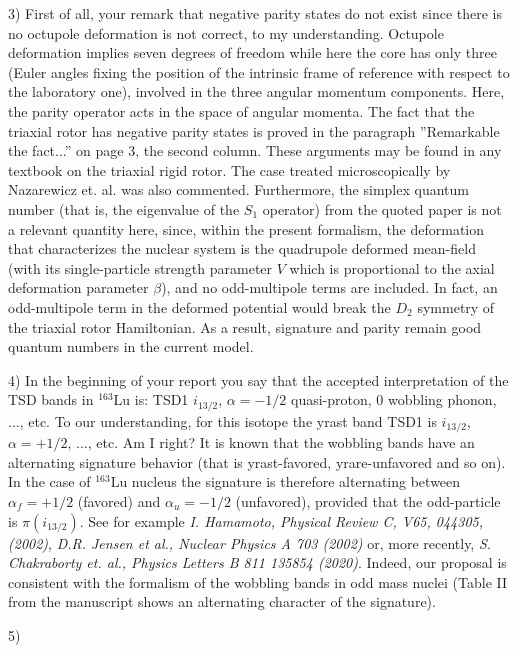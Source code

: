 \documentclass[11pt,a4paper]{article}
\begin{document}
3) First of all, your remark that negative parity states do not exist since there is no octupole deformation is not correct, to my understanding. Octupole deformation implies seven degrees of freedom while here the core has only three (Euler angles fixing the position of the intrinsic frame of reference with respect to the laboratory one), involved in the three angular momentum components. Here, the parity operator acts in the space of angular momenta. The fact that the triaxial rotor has negative parity states is proved in the paragraph ”Remarkable the fact...” on page 3, the second column. These arguments may be found in any textbook on the triaxial rigid rotor. The case treated microscopically by Nazarewicz et. al. was also commented. Furthermore, the simplex quantum number (that is, the eigenvalue of the $S_1$ operator) from the quoted paper is not a relevant quantity here, since, within the present formalism, the deformation that characterizes the nuclear system is the quadrupole deformed mean-field (with its single-particle strength parameter $V$ which is proportional to the axial deformation parameter $\beta$), and no odd-multipole terms are included. In fact, an odd-multipole term in the deformed potential would break the $D_2$ symmetry of the triaxial rotor Hamiltonian. As a result, signature and parity remain good quantum numbers in the current model.

4) In the beginning of your report you say that the accepted interpretation of the TSD bands in $^{163}$Lu is: TSD1 $i_{13/2}$, $\alpha = -1/2$ quasi-proton, 0 wobbling phonon, ..., etc. To our understanding, for this isotope the yrast band TSD1 is $i_{13/2}$,  $\alpha= +1/2$, ..., etc. Am I right? It is known that the wobbling bands have an alternating signature behavior (that is yrast-favored, yrare-unfavored and so on). In the case of $^{163}$Lu nucleus the signature is therefore alternating between $\alpha_f=+1/2$ (favored) and $\alpha_u=-1/2$ (unfavored), provided that the odd-particle is $\pi(i_{13/2})$. See for example \emph{I. Hamamoto, Physical Review C, V65, 044305, (2002)}, \emph{D.R. Jensen et al., Nuclear Physics A 703 (2002)} or, more recently, \emph{S. Chakraborty et. al., Physics Letters B 811 135854 (2020)}. Indeed, our proposal is consistent with the formalism of the wobbling bands in odd mass nuclei (Table II from the manuscript shows an alternating character of the signature).

5)
\end{document}
